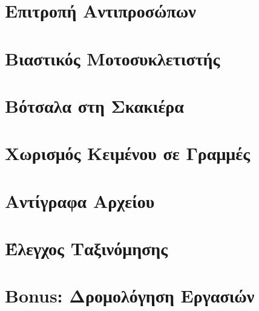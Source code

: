 \documentclass[a4paper,10pt]{article} \usepackage{anysize}
\begin{document}
\renewcommand{\labelenumi}{\roman{enumi})}
\renewcommand{\labelenumii}{(\arabic{enumii})}



\section{Επιτροπή Αντιπροσώπων} \setcounter{section}{1}


\vspace{3cm}

\section{Βιαστικός Μοτοσυκλετιστής}


\vspace{3cm}

\section{Βότσαλα στη Σκακιέρα}


\vspace{3cm}

\section{Χωρισμός Κειμένου σε Γραμμές}


\vspace{3cm}

\section{Αντίγραφα Αρχείου}


\vspace{3cm}

\section{Έλεγχος Ταξινόμησης}


\vspace{3cm}

\section{Bonus: Δρομολόγηση Εργασιών}

\end{document}
